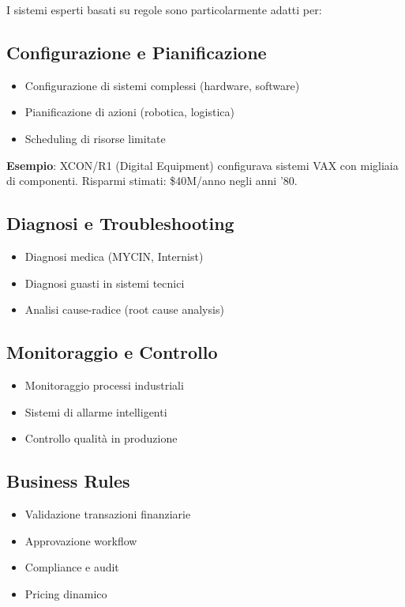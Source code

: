 I sistemi esperti basati su regole sono particolarmente adatti per:

\subsection{Configurazione e Pianificazione}

\begin{itemize}
\item Configurazione di sistemi complessi (hardware, software)
\item Pianificazione di azioni (robotica, logistica)
\item Scheduling di risorse limitate
\end{itemize}

\textbf{Esempio}: XCON/R1 (Digital Equipment) configurava sistemi VAX con migliaia di componenti. Risparmi stimati: \$40M/anno negli anni '80.

\subsection{Diagnosi e Troubleshooting}

\begin{itemize}
\item Diagnosi medica (MYCIN, Internist)
\item Diagnosi guasti in sistemi tecnici
\item Analisi cause-radice (root cause analysis)
\end{itemize}

\subsection{Monitoraggio e Controllo}

\begin{itemize}
\item Monitoraggio processi industriali
\item Sistemi di allarme intelligenti
\item Controllo qualità in produzione
\end{itemize}

\subsection{Business Rules}

\begin{itemize}
\item Validazione transazioni finanziarie
\item Approvazione workflow
\item Compliance e audit
\item Pricing dinamico
\end{itemize}

